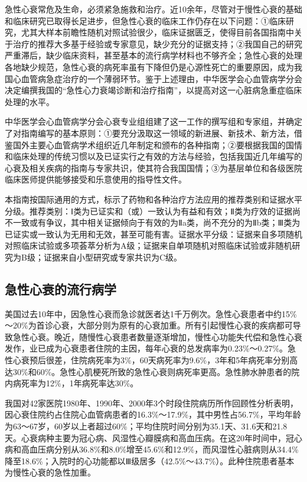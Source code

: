 急性心衰常危及生命，必须紧急施救和治疗。近10余年，尽管对于慢性心衰的基础和临床研究已取得长足进步，但急性心衰的临床工作仍存在以下问题：①临床研究，尤其大样本前瞻性随机对照试验很少，临床证据匮乏，使得目前各国指南中关于治疗的推荐大多基于经验或专家意见，缺少充分的证据支持；②我国自己的研究严重滞后，缺少临床资料，甚至基本的流行病学材料也不够齐全；急性心衰的处理各地缺少规范，急性心衰的病死率虽有下降但仍是心源性死亡的重要原因，成为我国心血管病急症治疗的一个薄弱环节。鉴于上述理由，中华医学会心血管病学分会决定编撰我国的“急性心力衰竭诊断和治疗指南”，以提高对这一心脏病急重症临床处理的水平。

中华医学会心血管病学分会心衰专业组组建了这一工作的撰写组和专家组，并确定了对指南编写的基本原则：①要充分汲取这一领域的新进展、新技术、新方法，借鉴国外主要心血管病学术组织近几年制定和颁布的各种指南；②要根据我国的国情和临床处理的传统习惯以及已证实行之有效的方法与经验，包括我国近几年编写的心衰及相关疾病的指南与专家共识，使其符合我国国情；③为基层单位和各级医院临床医师提供能够接受和乐意使用的指导性文件。

本指南按国际通用的方式，标示了药物和各种治疗方法应用的推荐类别和证据水平分级。推荐类别：Ⅰ类为已证实和（或）一致认为有益和有效；Ⅱ类为疗效的证据尚不一致或有争议，其中相关证据倾向于有效的为Ⅱa类，尚不充分的为Ⅱb类；Ⅲ类为已证实或一致认为无用和无效，甚至可能有害。证据水平分级：证据来自多项随机对照临床试验或多项荟萃分析为A级；证据来自单项随机对照临床试验或非随机研究为B级；证据来自小型研究或专家共识为C级。

\subsection{急性心衰的流行病学}

美国过去10年中，因急性心衰而急诊就医者达1千万例次。急性心衰患者中约15\%～20\%为首诊心衰，大部分则为原有的心衰加重。所有引起慢性心衰的疾病都可导致急性心衰。晚近，随慢性心衰患者数量逐渐增加，慢性心功能失代偿和急性心衰发作，业已成为心衰患者住院的主因，每年心衰的总发病率为0.23\%～0.27\%。急性心衰预后很差，住院病死率为3\%，60天病死率为9.6\%，3年和5年病死率分别高达30\%和60\%。急性心肌梗死所致的急性心衰则病死率更高。急性肺水肿患者的院内病死率为12\%，1年病死率达30\%。

我国对42家医院1980年、1990年、2000年3个时段住院病历所作回顾性分析表明，因心衰住院约占住院心血管病患者的16.3\%～17.9\%，其中男性占56.7\%，平均年龄为63～67岁，60岁以上者超过60\%；平均住院时间分别为35.1天、31.6天和21.8天。心衰病种主要为冠心病、风湿性心瓣膜病和高血压病。在这20年时间中，冠心病和高血压病分别从36.8\%和8.0\%增至45.6\%和12.9\%，而风湿性心脏病则从34.4\%降至18.6\%；入院时的心功能都以Ⅲ级居多（42.5\%～43.7\%）。此种住院患者基本为慢性心衰的急性加重。

